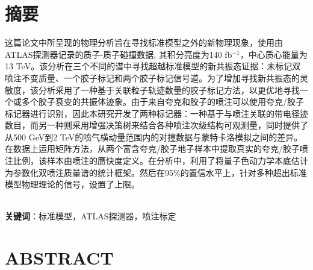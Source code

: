 \documentclass[UTF8,12pt]{ctexart}
\numberwithin{equation}{section}
\renewcommand{\rm}{\mathrm}
\begin{document}
		\newpage
		\pagestyle{fancy}
		\fancyhf{}
		\cfoot{$\bm{-\,\rm{\thepage}\,-}$}
		
		
		
		\section*{摘\quad 要}
		
\hspace{8mm}
这篇论文中所呈现的物理分析旨在寻找标准模型之外的新物理现象，使用由ATLAS探测器记录的质子-质子碰撞数据, 其积分亮度为140 fb$^{-1}$，中心质心能量为13 TeV。该分析在三个不同的谱中寻找超越标准模型的新共振态证据：未标记双喷注不变质量、一个胶子标记和两个胶子标记信号道。为了增加寻找新共振态的灵敏度，该分析采用了一种基于关联粒子轨迹数量的胶子标记方法，以更优地寻找一个或多个胶子衰变的共振体迹象。由于来自夸克和胶子的喷注可以使用夸克/胶子标记器进行识别，因此本研究开发了两种标记器：一种基于与喷注关联的带电径迹数目，而另一种则采用增强决策树来结合各种喷注次级结构可观测量，同时提供了从500 GeV到2 TeV的喷气横动量范围内的对撞数据与蒙特卡洛模拟之间的差异。在数据上运用矩阵方法，从两个富含夸克/胶子地子样本中提取真实的夸克/胶子喷注比例，该样本由喷注的赝快度定义。在分析中，利用了将量子色动力学本底估计为参数化双喷注质量谱的统计框架。然后在95\%的置信水平上，针对多种超出标准模型物理理论的信号，设置了上限。		
		
		
~\\
\textbf{关键词}：标准模型，ATLAS探测器，喷注标定

		
		
		


\newpage


\section*{\textbf{ABSTRACT}}

\hspace{8mm}
\end{document}
